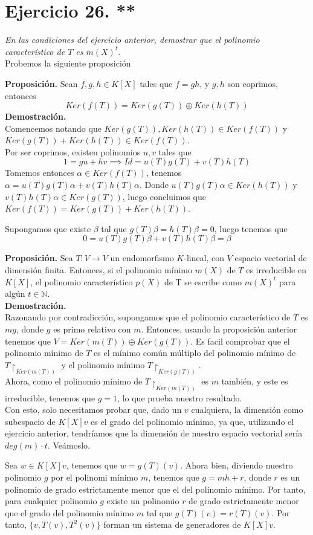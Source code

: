 \section{Ejercicio 26. **} \textit{En las condiciones del ejercicio anterior,
  demostrar que el polinomio característico de \(T\) es \(m(X)^t\)}.\\

Probemos la siguiente proposición

\textbf{Proposición. }Sean \(f,g,h \in K[X]\) tales que \(f = gh\), y \(g,h\) son
coprimos, entonces
\[
  Ker(f(T)) = Ker(g(T)) \oplus Ker(h(T))
\]
\textbf{Demostración.}\\
Comencemos notando que \(Ker(g(T)), Ker(h(T)) \in Ker(f(T))\) y \(Ker(g(T)) +
Ker(h(T)) \in Ker(f(T))\).\\ Por ser coprimos, existen polinomios \(u,v\) tales
que
\[
  1 = gu + hv \implies Id = u(T)g(T) + v(T)h(T)
\]
Tomemos entonces \(\alpha \in Ker(f(T))\), tenemos \(\alpha = u(T)g(T)\alpha +
v(T)h(T)\alpha\).
Donde  \( u(T)g(T)\alpha \in Ker(h(T))\) y  \( v(T)h(T)\alpha \in Ker(g(T))\),
luego concluimos que \(Ker(f(T)) = Ker(g(T)) + Ker(h(T))\).

Supongamos que existe \(\beta\) tal que \(g(T)\beta = h(T)\beta = 0\), luego
tenemos que
\[
  0 = u(T)g(T)\beta + v(T)h(T)\beta = \beta
\]

\textbf{Proposición.} Sea \(T: V \rightarrow V \) un endomorfismo \(K\)-lineal, con \(V\) espacio vectorial de dimensión finita. Entonces, si el polinomio mínimo \(m(X)\) de  \(T\) es irreducible en  \(K[X]\), el polinomio característico \(p(X)\) de T se escribe como \(m(X)^t\) para algún \(t \in \mathbb{N}\).\\

\textbf{Demostración.}\\
Razonando por contradicción, supongamos que el polinomio característico de \(T\) es  \(mg\), donde  \(g\) es primo relativo con \(m\). Entonces, usando la proposición anterior tenemos que \(V = Ker(m(T)) \oplus Ker(g(T))\). Es facil comprobar que el polinomio mínimo de \(T\) es el mínimo común múltiplo del polinomio mínimo de \(T\restriction_{Ker(m(T))}\) y el polinomio mínimo \(T\restriction_{Ker(g(T))}\).\\

Ahora, como el polinomio mínimo de \(T\restriction_{Ker(m(T))}\) es \(m\) también, y este es irreducible, tenemos que \(g = 1\), lo que prueba nuestro resultado.\\

Con esto, solo necesitamos probar que, dado un \(v\) cualquiera, la dimensión como subespacio de \(K[X]v\) es el grado del polinomio mínimo, ya que, utilizando el ejercicio anterior, tendríamos que la dimensión de nuestro espacio vectorial sería \(deg(m) \cdot t\). Veámoslo.

Sea \(w \in K[X]v\), tenemos que  \(w = g(T)(v)\). Ahora bien, diviendo nuestro polinomio  \(g\) por el polinomi mínimo  \(m\), tenemos que  \(g = mh + r\), donde \(r\) es un polinomio de grado estrictamente menor que el del polinomio mínimo. Por tanto, para cualquier polinomio \(g\) existe un polinomio \(r\) de grado estrictamente menor que el grado del polinomio mínimo \(m\) tal que \(g(T)(v) = r(T)(v)\). Por tanto, \(\{v, T(v), T^2(v)\}\) forman un sistema de generadores de \(K[X]v\).
